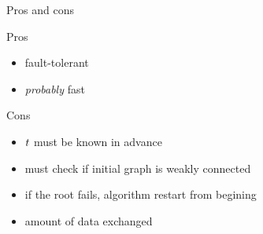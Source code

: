 \documentclass[10pt, compress]{beamer}
\begin{document}
\begin{frame}{Pros and cons}
    \begin{exampleblock}{Pros}
    \begin{itemize}
    \item fault-tolerant
    \item \textit{probably} fast
    \end{itemize}
    \end{exampleblock}
    \begin{alertblock}{Cons}
    \begin{itemize}
    \item $\mathnormal{t}$ must be known in advance
    \item must check if initial graph is weakly connected
    \item if the root fails, algorithm restart from begining
    \item amount of data exchanged
    \end{itemize}
    \end{alertblock}
\end{frame}


\end{document}
